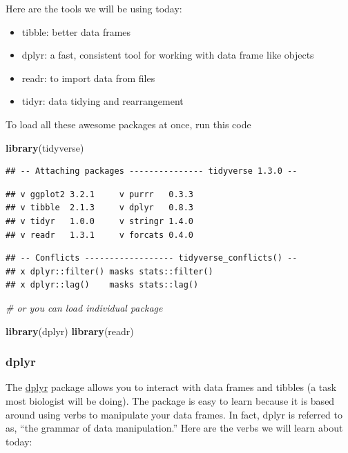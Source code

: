 \documentclass[
]{article}
\newenvironment{Shaded}{\begin{snugshade}}{\end{snugshade}}
\newcommand{\CommentTok}[1]{\textcolor[rgb]{0.56,0.35,0.01}{\textit{#1}}}
\newcommand{\KeywordTok}[1]{\textcolor[rgb]{0.13,0.29,0.53}{\textbf{#1}}}
\newcommand{\NormalTok}[1]{#1}
\providecommand{\tightlist}{%
  \setlength{\itemsep}{0pt}\setlength{\parskip}{0pt}}
\begin{document}
Here are the tools we will be using today:

\begin{itemize}
\tightlist
\item
  tibble: better data frames
\item
  dplyr: a fast, consistent tool for working with data frame like
  objects
\item
  readr: to import data from files
\item
  tidyr: data tidying and rearrangement
\end{itemize}

To load all these awesome packages at once, run this code

\begin{Shaded}
\begin{Highlighting}[]
\KeywordTok{library}\NormalTok{(tidyverse)}
\end{Highlighting}
\end{Shaded}

\begin{verbatim}
## -- Attaching packages --------------- tidyverse 1.3.0 --
\end{verbatim}

\begin{verbatim}
## v ggplot2 3.2.1     v purrr   0.3.3
## v tibble  2.1.3     v dplyr   0.8.3
## v tidyr   1.0.0     v stringr 1.4.0
## v readr   1.3.1     v forcats 0.4.0
\end{verbatim}

\begin{verbatim}
## -- Conflicts ------------------ tidyverse_conflicts() --
## x dplyr::filter() masks stats::filter()
## x dplyr::lag()    masks stats::lag()
\end{verbatim}

\begin{Shaded}
\begin{Highlighting}[]
\CommentTok{# or you can load individual package}

\KeywordTok{library}\NormalTok{(dplyr)}
\KeywordTok{library}\NormalTok{(readr)}
\end{Highlighting}
\end{Shaded}

\hypertarget{dplyr}{%
\subsubsection{dplyr}\label{dplyr}}

The \href{https://dplyr.tidyverse.org/}{dplyr} package allows you to
interact with data frames and tibbles (a task most biologist will be
doing). The package is easy to learn because it is based around using
verbs to manipulate your data frames. In fact, dplyr is referred to as,
``the grammar of data manipulation.'' Here are the verbs we will learn
about today:
\end{document}
